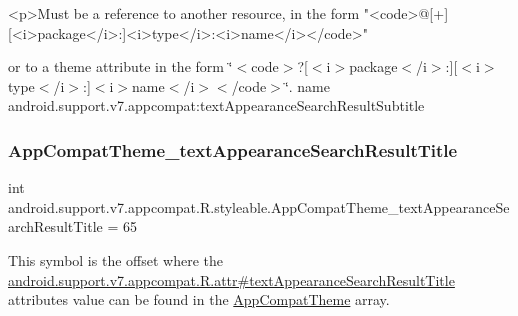 \begin{DoxyVerb}      <p>Must be a reference to another resource, in the form "<code>@[+][<i>package</i>:]<i>type</i>:<i>name</i></code>"
\end{DoxyVerb}
 or to a theme attribute in the form \char`\"{}$<$code$>$?\mbox{[}$<$i$>$package$<$/i$>$\+:\mbox{]}\mbox{[}$<$i$>$type$<$/i$>$\+:\mbox{]}$<$i$>$name$<$/i$>$$<$/code$>$\char`\"{}.  name android.\+support.\+v7.\+appcompat\+:text\+Appearance\+Search\+Result\+Subtitle \mbox{\label{classandroid_1_1support_1_1v7_1_1appcompat_1_1R_1_1styleable_a9d65706b447bcd2a979584ec58b642f9}} 
\subsubsection{\texorpdfstring{App\+Compat\+Theme\+\_\+text\+Appearance\+Search\+Result\+Title}{AppCompatTheme\_textAppearanceSearchResultTitle}}
{\footnotesize\ttfamily int android.\+support.\+v7.\+appcompat.\+R.\+styleable.\+App\+Compat\+Theme\+\_\+text\+Appearance\+Search\+Result\+Title = 65\hspace{0.3cm}{\ttfamily [static]}}

This symbol is the offset where the \hyperlink{classandroid_1_1support_1_1v7_1_1appcompat_1_1R_1_1attr_a43ccbb8c59728fcd3080051a85e6f970}{android.\+support.\+v7.\+appcompat.\+R.\+attr\#text\+Appearance\+Search\+Result\+Title} attribute\textquotesingle{}s value can be found in the \hyperlink{classandroid_1_1support_1_1v7_1_1appcompat_1_1R_1_1styleable_a5c42f89e8a410c323be34208d75c430b}{App\+Compat\+Theme} array.

